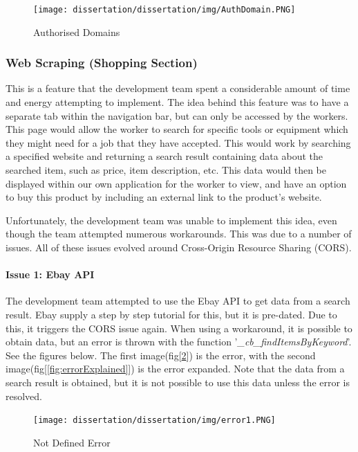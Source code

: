 \begin{figure}[H]
    \centering
    \texttt{[image: dissertation/dissertation/img/AuthDomain.PNG]}
    \caption{Authorised Domains}
    \label{fig:domain}
\end{figure}

\subsubsection{Web Scraping (Shopping Section)}
\label{sec:SystemEvaluationWebScraping}
This is a feature that the development team spent a considerable amount of time and energy attempting to implement. The idea behind this feature was to have a separate tab within the navigation bar, but can only be accessed by the workers. This page would allow the worker to search for specific tools or equipment which they might need for a job that they have accepted. This would work by searching a specified website and returning a search result containing data about the searched item, such as price, item description, etc. This data would then be displayed within our own application for the worker to view, and have an option to buy this product by including an external link to the product's website.

\bigskip

Unfortunately, the development team was unable to implement this idea, even though the team attempted numerous workarounds. This was due to a number of issues. All of these issues evolved around Cross-Origin Resource Sharing (CORS).

\paragraph{Issue 1: Ebay API}
The development team attempted to use the Ebay API to get data from a search result. Ebay supply a step by step tutorial for this, but it is pre-dated. Due to this, it triggers the CORS issue again. When using a workaround, it is possible to obtain data, but an error is thrown with the function '\textit{\_cb\_findItemsByKeyword}'. See the figures below. The first image(fig[\ref{fig:errorCors}]) is the error, with the second image(fig[\ref{fig:errorExplained}]) is the error expanded. Note that the data from a search result is obtained, but it is not possible to use this data unless the error is resolved.
\begin{figure}[H]
    \centering
    \texttt{[image: dissertation/dissertation/img/error1.PNG]}
    \caption{Not Defined Error}
    \label{fig:errorCors}
\end{figure}

